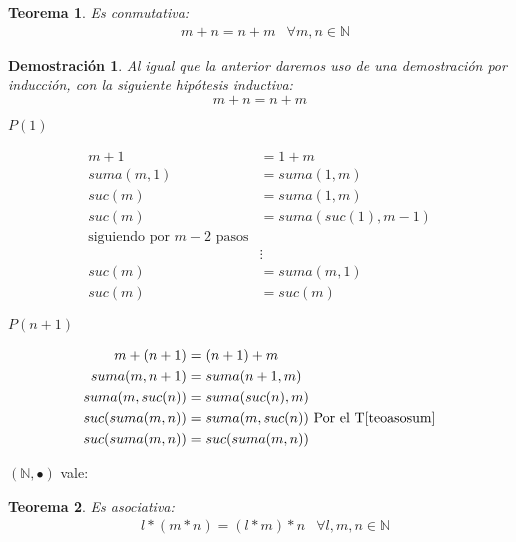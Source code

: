 \documentclass[9pt,a4paper,draft]{article}
\theoremstyle{definition}
\theoremstyle{plain}
\newtheorem{teo}{Teorema}
\newtheorem{demo}{Demostración}[teo]
\begin{document}
\begin{teo} \label{teoconmusum} Es conmutativa:\\
\begin{align*} & m+n=n+m & \forall m,n\in{\mathbb{N}} \end{align*}
\end{teo}

\begin{demo}

Al igual que la anterior daremos uso de una demostración por inducción, con la siguiente hipótesis inductiva:\\

$$m+n=n+m$$

$P(1)$

\begin{align*}
m+1       &= 1+m\\
suma(m,1) &= suma(1,m)\\
suc(m)    &= suma(1,m)\\
suc(m)    &= suma(suc(1), m-1)\\
\text{siguiendo por $m-2$ pasos}\\
          & \vdots\\
suc(m)    &= suma(m, 1)\\
suc(m)    &= suc(m)
\end{align*}

$P(n+1)$

\begin{align*}
m+(n+1)         &= (n+1)+m\\
suma(m,n+1)     &= suma(n+1,m)\\
suma(m, suc(n)) &= suma(suc(n), m)\\
suc(suma(m,n))  &= suma(m,suc(n)) \text{ Por el T\ref{teoasosum}}\\
suc(suma(m,n))  &= suc(suma(m,n))
\end{align*}
\end{demo}

$(\mathbb{N}, \bullet)$ vale:

\begin{teo} \label{teoasopro}Es asociativa:\\
\begin{align*} & l*(m*n)=(l*m)*n & \forall l,m,n\in{\mathbb{N}} \end{align*}
\end{teo}
\end{document}
